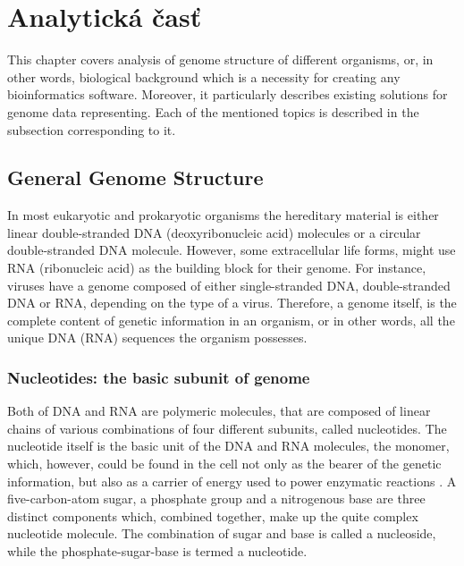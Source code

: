 
\chapter{Analytická časť}

This chapter covers analysis of genome structure of different organisms, or, in other words, biological background which is a necessity for creating any bioinformatics software.
Moreover, it particularly describes existing solutions for genome data representing. 
Each of the mentioned topics is described in the subsection corresponding to it.

\section{General Genome Structure}
In most eukaryotic and prokaryotic organisms the hereditary material is either linear double-stranded DNA (deoxyribonucleic acid) molecules or a circular double-stranded DNA molecule. 
However, some extracellular life forms, might use RNA (ribonucleic acid) as the building block for their genome. 
For instance, viruses have a genome composed of either single-stranded DNA, double-stranded DNA or RNA, depending on the type of a virus. 
Therefore, a genome itself, is the complete content of genetic information in an organism, or in other words, all the unique DNA (RNA) sequences the organism possesses. 

\subsection{Nucleotides: the basic subunit of genome}
Both of DNA and RNA  are polymeric molecules, that are composed of linear chains of various combinations of four different subunits, called nucleotides. 
The nucleotide itself is the basic unit of the DNA and RNA molecules, the monomer, which, however, could be found in the cell not only as the bearer of the genetic information, 
but also as a carrier of energy used to power enzymatic reactions \cite{AnalysisOfGenesAndGenomes}. 
A five-carbon-atom sugar, a phosphate group and a nitrogenous base are three distinct components which, combined together, make up the quite complex nucleotide molecule. 
The combination of sugar and base is called a nucleoside, while the phosphate-sugar-base is termed a nucleotide. 


